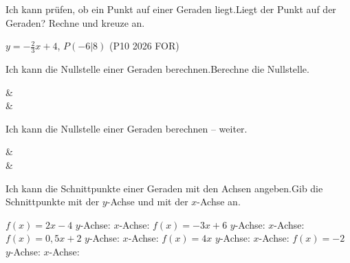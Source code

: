 
\begin{aufgabe}{Ich kann prüfen, ob ein Punkt auf einer Geraden liegt.\newline Liegt der Punkt auf der Geraden? Rechne und kreuze an.}
\begin{teile}
\teil $y = -\frac{2}{3}x + 4$, \quad $P({-6}|8)$ \quad (P10 2026 FOR) \quad \janein
\end{teile}
\end{aufgabe}


\begin{aufgabe}{Ich kann die Nullstelle einer Geraden berechnen.\newline Berechne die Nullstelle.}
\begin{gleichungsraster}[2]
 &  \\
 &  \\
\end{gleichungsraster}
\end{aufgabe}

\begin{aufgabe}{Ich kann die Nullstelle einer Geraden berechnen – weiter.}
\begin{gleichungsraster}[2]
 &  \\
 & \\
\end{gleichungsraster}
\end{aufgabe}

\begin{aufgabe}{Ich kann die Schnittpunkte einer Geraden mit den Achsen angeben.\newline Gib die Schnittpunkte mit der $y$-Achse und mit der $x$-Achse an.}
\begin{teile}
\teil $f(x) = 2x - 4$ \hfill $y$-Achse: \punktfeld \quad $x$-Achse: \punktfeld
\teil $f(x) = -3x + 6$ \hfill $y$-Achse: \punktfeld \quad $x$-Achse: \punktfeld
\teil $f(x) = 0{,}5x + 2$ \hfill $y$-Achse: \punktfeld \quad $x$-Achse: \punktfeld
\teil $f(x) = 4x$ \hfill $y$-Achse: \punktfeld \quad $x$-Achse: \punktfeld
\teil $f(x) = -2$ \hfill $y$-Achse: \punktfeld \quad $x$-Achse: \punktfeld
\end{teile}
\end{aufgabe}

